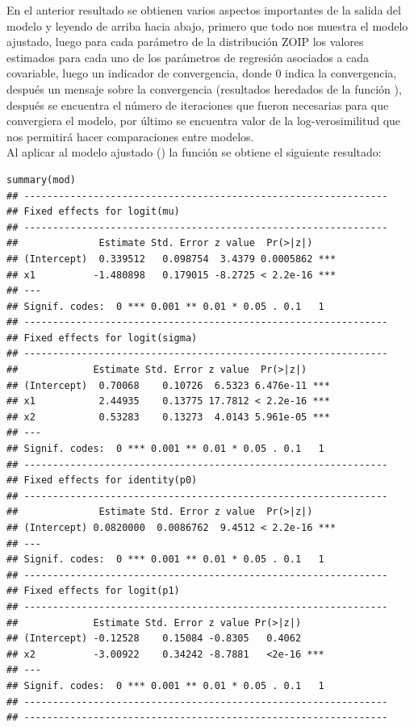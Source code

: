 En el anterior resultado se obtienen varios aspectos importantes de la salida del modelo y leyendo de arriba hacia abajo, primero que todo nos muestra el modelo ajustado, luego para cada par\'{a}metro de la distribuci\'{o}n ZOIP los valores estimados para cada uno de los pa\-r\'{a}\-me\-tros de regresi\'{o}n asociados a cada covariable, luego un indicador de convergencia, donde 0 indica la convergencia, despu\'{e}s un mensaje sobre la convergencia (resultados heredados de la funci\'{o}n ), despu\'{e}s se encuentra el n\'{u}mero de iteraciones que fueron necesarias para que convergiera el modelo, por \'{u}ltimo se encuentra valor de la log-verosimilitud que nos permitir\'{a} hacer comparaciones entre modelos.\\ 

 Al aplicar al modelo ajustado () la funci\'{o}n  se obtiene el siguiente resultado:

\begin{verbatim}
summary(mod)
## ---------------------------------------------------------------
## Fixed effects for logit(mu) 
## ---------------------------------------------------------------
##              Estimate Std. Error z value  Pr(>|z|)    
## (Intercept)  0.339512   0.098754  3.4379 0.0005862 ***
## x1          -1.480898   0.179015 -8.2725 < 2.2e-16 ***
## ---
## Signif. codes:  0 *** 0.001 ** 0.01 * 0.05 . 0.1   1
## ---------------------------------------------------------------
## Fixed effects for logit(sigma) 
## ---------------------------------------------------------------
##             Estimate Std. Error z value  Pr(>|z|)    
## (Intercept)  0.70068    0.10726  6.5323 6.476e-11 ***
## x1           2.44935    0.13775 17.7812 < 2.2e-16 ***
## x2           0.53283    0.13273  4.0143 5.961e-05 ***
## ---
## Signif. codes:  0 *** 0.001 ** 0.01 * 0.05 . 0.1   1
## ---------------------------------------------------------------
## Fixed effects for identity(p0) 
## ---------------------------------------------------------------
##              Estimate Std. Error z value  Pr(>|z|)    
## (Intercept) 0.0820000  0.0086762  9.4512 < 2.2e-16 ***
## ---
## Signif. codes:  0 *** 0.001 ** 0.01 * 0.05 . 0.1   1
## ---------------------------------------------------------------
## Fixed effects for logit(p1) 
## ---------------------------------------------------------------
##             Estimate Std. Error z value Pr(>|z|)    
## (Intercept) -0.12528    0.15084 -0.8305   0.4062    
## x2          -3.00922    0.34242 -8.7881   <2e-16 ***
## ---
## Signif. codes:  0 *** 0.001 ** 0.01 * 0.05 . 0.1   1
## ---------------------------------------------------------------
## ---------------------------------------------------------------
\end{verbatim}

